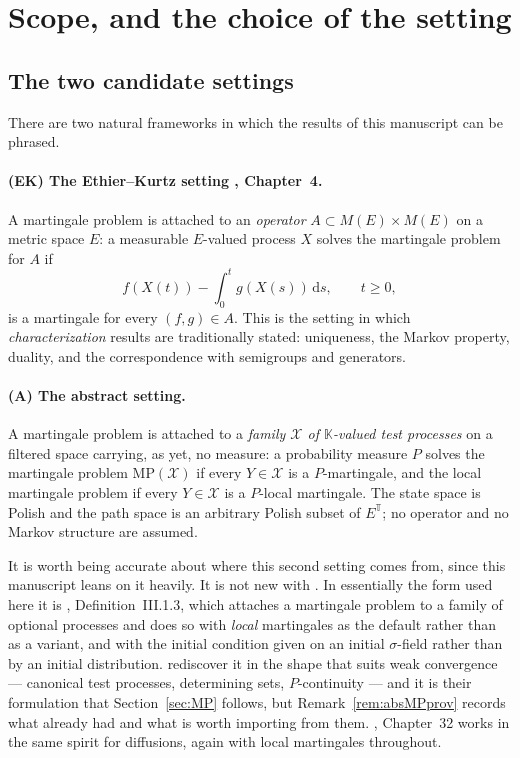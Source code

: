 \documentclass[11pt,a4paper]{article}
\theoremstyle{plain}
\theoremstyle{definition}
\theoremstyle{remark}
\newcommand{\T}{\mathbb{T}}                     %
\newcommand{\Meas}{M}                          %
\newcommand{\K}{\mathbb{K}}
\newcommand{\XX}{\mathcal{X}}                  %
\newcommand{\MP}{\mathrm{MP}}
\newcommand{\dif}{\,\mathrm{d}}
\newcommand{\EK}{\cite{EK86}}
\newcommand{\CPS}{\cite{CPS23}}
\newcommand{\KA}{\cite{Kal21}}
\newcommand{\JS}{\cite{JS03}}
\begin{document}
\tableofcontents

\section{Scope, and the choice of the setting}
\label{sec:setting}

\subsection{The two candidate settings}

There are two natural frameworks in which the results of this manuscript can be
phrased.

\paragraph{(EK) The Ethier--Kurtz setting \EK, Chapter~4.}
A martingale problem is attached to an \emph{operator}
$A \subset \Meas(E) \times \Meas(E)$ on a metric space $E$: a measurable
$E$-valued process $X$ solves the martingale problem for $A$ if
\begin{equation}
  \label{eq:EKtest}
  f(X(t)) - \int_0^t g(X(s)) \dif s , \qquad t \geq 0,
\end{equation}
is a martingale for every $(f,g) \in A$.  This is the setting in which
\emph{characterization} results are traditionally stated: uniqueness, the Markov
property, duality, and the correspondence with semigroups and generators.

\paragraph{(A) The abstract setting.}
A martingale problem is attached to a \emph{family $\XX$ of $\K$-valued test
processes} on a filtered space carrying, as yet, no measure: a probability
measure $P$ solves the martingale problem $\MP(\XX)$ if every $Y \in \XX$ is a
$P$-martingale, and the local martingale problem if every $Y \in \XX$ is a
$P$-local martingale.  The state space is Polish and the path space is an
arbitrary Polish subset of $E^{\T}$; no operator and no Markov structure are
assumed.

It is worth being accurate about where this second setting comes from, since
this manuscript leans on it heavily.  It is not new with \CPS.  In essentially
the form used here it is \JS, Definition~III.1.3, which attaches a martingale
problem to a family of optional processes and does so with \emph{local}
martingales as the default rather than as a variant, and with the initial
condition given on an initial $\sigma$-field rather than by an initial
distribution.  \CPS{} rediscover it in the shape that suits weak convergence ---
canonical test processes, determining sets, $P$-continuity --- and it is their
formulation that Section~\ref{sec:MP} follows, but Remark~\ref{rem:absMPprov}
records what \JS{} already had and what is worth importing from them.
\KA, Chapter~32 works in the same spirit for diffusions, again with local
martingales throughout.
\end{document}
